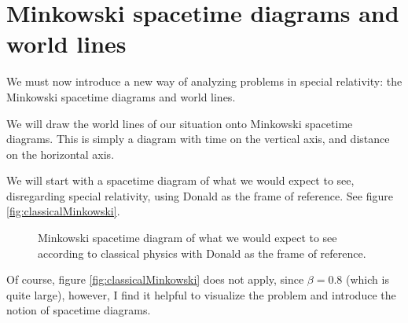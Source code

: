 \section{Minkowski spacetime diagrams and world lines}
	We must now introduce a new way of analyzing problems in special relativity: the Minkowski spacetime diagrams and world lines.

	We will draw the world lines of our situation onto Minkowski spacetime diagrams.
	This is simply a diagram with time on the vertical axis, and distance on the horizontal axis.

	We will start with a spacetime diagram of what we would expect to see, disregarding special relativity, using Donald as the frame of reference. See figure \vref{fig:classicalMinkowski}.
	\begin{figure}[H]
		\begin{minipage}{0.3\textwidth}
			\caption{Minkowski spacetime diagram of what we would expect to see according to classical physics with Donald as the frame of reference.}
			\label{fig:classicalMinkowski}
		\end{minipage}
		\hfill
		\begin{minipage}{0.6\textwidth}
		\end{minipage}
	\end{figure}
	Of course, figure \vref{fig:classicalMinkowski} does not apply, since $\beta = 0.8$ (which is quite large), however, I find it helpful to visualize the problem and introduce the notion of spacetime diagrams.
